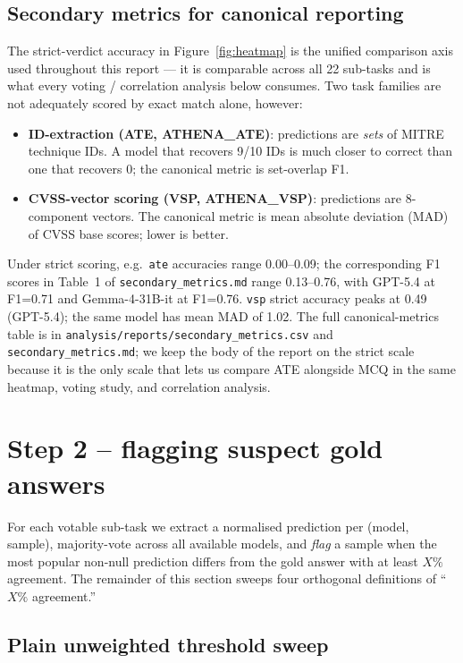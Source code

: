 \documentclass[10pt,a4paper]{article}
\begin{document}
\subsection{Secondary metrics for canonical reporting}\label{sec:secondary}

The strict-verdict accuracy in Figure~\ref{fig:heatmap} is the unified comparison axis used throughout this report --- it is comparable across all 22 sub-tasks and is what every voting / correlation analysis below consumes. Two task families are not adequately scored by exact match alone, however:

\begin{itemize}
\item \textbf{ID-extraction (ATE, ATHENA\_ATE)}: predictions are \emph{sets} of MITRE technique IDs. A model that recovers 9/10 IDs is much closer to correct than one that recovers 0; the canonical metric is set-overlap F1.
\item \textbf{CVSS-vector scoring (VSP, ATHENA\_VSP)}: predictions are 8-component vectors. The canonical metric is mean absolute deviation (MAD) of CVSS base scores; lower is better.
\end{itemize}

Under strict scoring, e.g.\ \texttt{ate} accuracies range 0.00--0.09; the corresponding F1 scores in Table~1 of \texttt{secondary\_metrics.md} range 0.13--0.76, with GPT-5.4 at F1=0.71 and Gemma-4-31B-it at F1=0.76. \texttt{vsp} strict accuracy peaks at 0.49 (GPT-5.4); the same model has mean MAD of 1.02. The full canonical-metrics table is in \texttt{analysis/reports/secondary\_metrics.csv} and \texttt{secondary\_metrics.md}; we keep the body of the report on the strict scale because it is the only scale that lets us compare ATE alongside MCQ in the same heatmap, voting study, and correlation analysis.

\section{Step 2 -- flagging suspect gold answers}

For each votable sub-task we extract a normalised prediction per (model, sample), majority-vote across all available models, and \emph{flag} a sample when the most popular non-null prediction differs from the gold answer with at least $X\%$ agreement. The remainder of this section sweeps four orthogonal definitions of ``$X\%$ agreement.''

\subsection{Plain unweighted threshold sweep}
\end{document}
